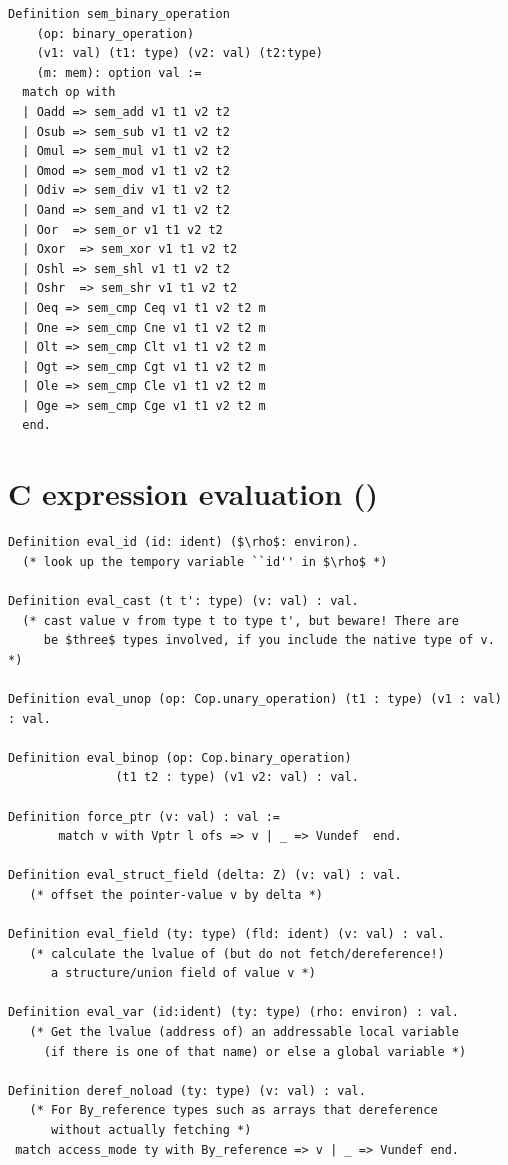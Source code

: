 \documentclass[12pt,fleqn,openany,oneside,showtrims]{memoir}
\newcommand{\ychapter}[2]{\chapter[#1]{#1 \hfill \normalsize #2}}
\begin{document}
\begin{lstlisting}
Definition sem_binary_operation
    (op: binary_operation)
    (v1: val) (t1: type) (v2: val) (t2:type)
    (m: mem): option val :=
  match op with
  | Oadd => sem_add v1 t1 v2 t2
  | Osub => sem_sub v1 t1 v2 t2
  | Omul => sem_mul v1 t1 v2 t2
  | Omod => sem_mod v1 t1 v2 t2
  | Odiv => sem_div v1 t1 v2 t2
  | Oand => sem_and v1 t1 v2 t2
  | Oor  => sem_or v1 t1 v2 t2
  | Oxor  => sem_xor v1 t1 v2 t2
  | Oshl => sem_shl v1 t1 v2 t2
  | Oshr  => sem_shr v1 t1 v2 t2
  | Oeq => sem_cmp Ceq v1 t1 v2 t2 m
  | One => sem_cmp Cne v1 t1 v2 t2 m
  | Olt => sem_cmp Clt v1 t1 v2 t2 m
  | Ogt => sem_cmp Cgt v1 t1 v2 t2 m
  | Ole => sem_cmp Cle v1 t1 v2 t2 m
  | Oge => sem_cmp Cge v1 t1 v2 t2 m
  end.
\end{lstlisting}

\ychapter{C expression evaluation}{()}

\begin{lstlisting}
Definition eval_id (id: ident) ($\rho$: environ).
  (* look up the tempory variable ``id'' in $\rho$ *)

Definition eval_cast (t t': type) (v: val) : val.
  (* cast value v from type t to type t', but beware! There are
     be $three$ types involved, if you include the native type of v. *)

Definition eval_unop (op: Cop.unary_operation) (t1 : type) (v1 : val) : val.

Definition eval_binop (op: Cop.binary_operation)
               (t1 t2 : type) (v1 v2: val) : val.

Definition force_ptr (v: val) : val :=
       match v with Vptr l ofs => v | _ => Vundef  end.

Definition eval_struct_field (delta: Z) (v: val) : val.
   (* offset the pointer-value v by delta *)

Definition eval_field (ty: type) (fld: ident) (v: val) : val.
   (* calculate the lvalue of (but do not fetch/dereference!)
      a structure/union field of value v *)

Definition eval_var (id:ident) (ty: type) (rho: environ) : val.
   (* Get the lvalue (address of) an addressable local variable
     (if there is one of that name) or else a global variable *)

Definition deref_noload (ty: type) (v: val) : val.
   (* For By_reference types such as arrays that dereference
      without actually fetching *)
 match access_mode ty with By_reference => v | _ => Vundef end.
\end{lstlisting}
\end{document}

